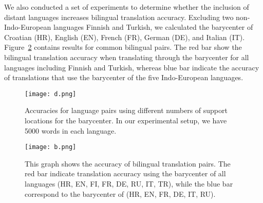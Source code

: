 \documentclass{article}
\begin{document}
We also conducted a set of experiments to determine whether the inclusion of distant languages increases bilingual translation accuracy. Excluding two non-Indo-European languages Finnish and Turkish, we calculated the barycenter of 
Croatian (HR), English (EN), French (FR), German (DE), and Italian (IT).
Figure~\ref{fig:compare} contains results for common bilingual pairs. The red bar show the bilingual translation accuracy when translating through the barycenter for all languages including Finnish and Turkish, whereas blue bar indicate the accuracy of translations that use the barycenter of the five Indo-European languages. 


\begin{figure}[ht]
    \centering
    \texttt{[image: d.png]}
    \caption{Accuracies for language pairs using different numbers of support locations for the barycenter. In our experimental setup, we have 5000 words in each language.
    }
\label{fig:number-of-support}
\end{figure}

\begin{figure}
    \centering
    \texttt{[image: b.png]}
    \caption{This graph shows the accuracy of bilingual translation pairs. The red bar indicate translation accuracy using the barycenter of all languages (HR, EN, FI, FR, DE, RU, IT, TR), while the blue bar correspond to the barycenter of (HR, EN, FR, DE, IT, RU).}
    \label{fig:compare}
\end{figure}
\end{document}
